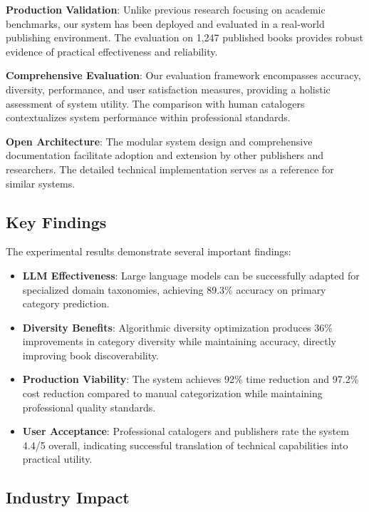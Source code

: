 \documentclass{article}
\begin{document}
\textbf{Production Validation}: Unlike previous research focusing on academic benchmarks, our system has been deployed and evaluated in a real-world publishing environment. The evaluation on 1,247 published books provides robust evidence of practical effectiveness and reliability.

\textbf{Comprehensive Evaluation}: Our evaluation framework encompasses accuracy, diversity, performance, and user satisfaction measures, providing a holistic assessment of system utility. The comparison with human catalogers contextualizes system performance within professional standards.

\textbf{Open Architecture}: The modular system design and comprehensive documentation facilitate adoption and extension by other publishers and researchers. The detailed technical implementation serves as a reference for similar systems.

\subsection{Key Findings}

The experimental results demonstrate several important findings:

\begin{itemize}
\item \textbf{LLM Effectiveness}: Large language models can be successfully adapted for specialized domain taxonomies, achieving 89.3\% accuracy on primary category prediction.

\item \textbf{Diversity Benefits}: Algorithmic diversity optimization produces 36\% improvements in category diversity while maintaining accuracy, directly improving book discoverability.

\item \textbf{Production Viability}: The system achieves 92\% time reduction and 97.2\% cost reduction compared to manual categorization while maintaining professional quality standards.

\item \textbf{User Acceptance}: Professional catalogers and publishers rate the system 4.4/5 overall, indicating successful translation of technical capabilities into practical utility.
\end{itemize}

\subsection{Industry Impact}
\end{document}
